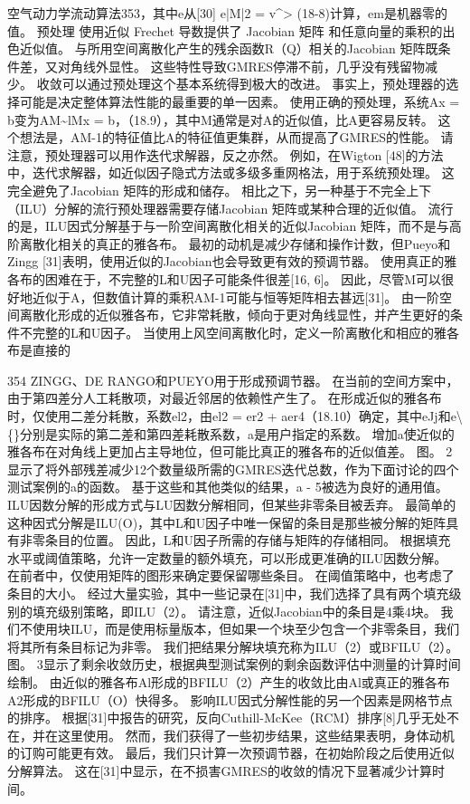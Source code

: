 \documentclass[UTF8,11pt,a4paper,openany,fontset=fandol]{ctexbook}
\begin{document}
空气动力学流动算法353，其中e从[30] e|M|2 = v\textasciicircum{}> (18-8)计算，em是机器零的值。 预处理 使用近似 Frechet 导数提供了 Jacobian 矩阵 和任意向量的乘积的出色近似值。 与所用空间离散化产生的残余函数R（Q）相关的Jacobian 矩阵既条件差，又对角线外显性。 这些特性导致GMRES停滞不前，几乎没有残留物减少。 收敛可以通过预处理这个基本系统得到极大的改进。 事实上，预处理器的选择可能是决定整体算法性能的最重要的单一因素。 使用正确的预处理，系统Ax = b变为AM\textasciitilde{}lMx = b，（18.9），其中M通常是对A的近似值，比A更容易反转。 这个想法是，AM-1的特征值比A的特征值更集群，从而提高了GMRES的性能。 请注意，预处理器可以用作迭代求解器，反之亦然。 例如，在Wigton [48]的方法中，迭代求解器，如近似因子隐式方法或多级多重网格法，用于系统预处理。 这完全避免了Jacobian 矩阵的形成和储存。 相比之下，另一种基于不完全上下（ILU）分解的流行预处理器需要存储Jacobian 矩阵或某种合理的近似值。 流行的是，ILU因式分解基于与一阶空间离散化相关的近似Jacobian 矩阵，而不是与高阶离散化相关的真正的雅各布。 最初的动机是减少存储和操作计数，但Pueyo和Zingg [31]表明，使用近似的Jacobian也会导致更有效的预调节器。 使用真正的雅各布的困难在于，不完整的L和U因子可能条件很差[16, 6]。 因此，尽管M可以很好地近似于A，但数值计算的乘积AM-1可能与恒等矩阵相去甚远[31]。 由一阶空间离散化形成的近似雅各布，它非常耗散，倾向于更对角线显性，并产生更好的条件不完整的L和U因子。 当使用上风空间离散化时，定义一阶离散化和相应的雅各布是直接的

354 ZINGG、DE RANGO和PUEYO用于形成预调节器。 在当前的空间方案中，由于第四差分人工耗散项，对最近邻居的依赖性产生了。 在形成近似的雅各布时，仅使用二差分耗散，系数el2，由el2 = er2 + aer4（18.10）确定，其中eJj和e\textbackslash\{\}分别是实际的第二差和第四差耗散系数，a是用户指定的系数。 增加a使近似的雅各布在对角线上更加占主导地位，但可能比真正的雅各布的近似值差。 图。 2显示了将外部残差减少12个数量级所需的GMRES迭代总数，作为下面讨论的四个测试案例的a的函数。 基于这些和其他类似的结果，a - 5被选为良好的通用值。 ILU因数分解的形成方式与LU因数分解相同，但某些非零条目被丢弃。 最简单的这种因式分解是ILU(O)，其中L和U因子中唯一保留的条目是那些被分解的矩阵具有非零条目的位置。 因此，L和U因子所需的存储与矩阵的存储相同。 根据填充水平或阈值策略，允许一定数量的额外填充，可以形成更准确的ILU因数分解。 在前者中，仅使用矩阵的图形来确定要保留哪些条目。 在阈值策略中，也考虑了条目的大小。 经过大量实验，其中一些记录在[31]中，我们选择了具有两个填充级别的填充级别策略，即ILU（2）。 请注意，近似Jacobian中的条目是4乘4块。 我们不使用块ILU，而是使用标量版本，但如果一个块至少包含一个非零条目，我们将其所有条目标记为非零。 我们把结果分解块填充称为ILU（2）或BFILU（2）。 图。 3显示了剩余收敛历史，根据典型测试案例的剩余函数评估中测量的计算时间绘制。 由近似的雅各布Al形成的BFILU（2）产生的收敛比由Al或真正的雅各布A2形成的BFILU（O）快得多。 影响ILU因式分解性能的另一个因素是网格节点的排序。 根据[31]中报告的研究，反向Cuthill-McKee（RCM）排序[8]几乎无处不在，并在这里使用。 然而，我们获得了一些初步结果，这些结果表明，身体动机的订购可能更有效。 最后，我们只计算一次预调节器，在初始阶段之后使用近似分解算法。 这在[31]中显示，在不损害GMRES的收敛的情况下显著减少计算时间。
\end{document}
